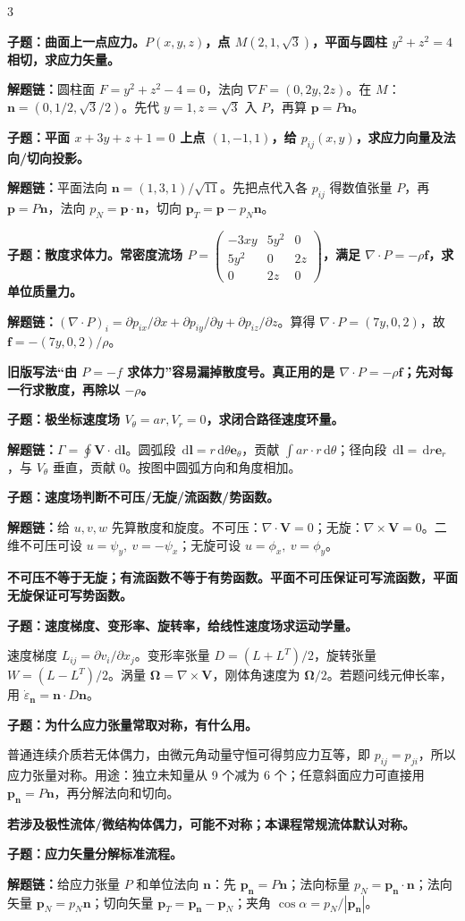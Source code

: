\documentclass[a4paper]{article}
\newcommand{\qt}[1]{\vspace{0.10pt}\colorbox{Q}{\parbox{\dimexpr\linewidth-2\fboxsep}{\color{white}\bfseries #1}}\par}
\newcommand{\ans}[1]{\colorbox{G}{\parbox{\dimexpr\linewidth-2\fboxsep}{#1}}\par}
\newcommand{\warn}[1]{\colorbox{Y}{\parbox{\dimexpr\linewidth-2\fboxsep}{\color{E}\bfseries #1}}\par}
\newcommand{\chain}[1]{{\color{A}\bfseries 解题链：}#1\par}
\newcommand{\dd}{\,\mathrm d}
\begin{document}
\begin{multicols}{3}
\qt{子题：曲面上一点应力。$P(x,y,z)$，点 $M(2,1,\sqrt3)$，平面与圆柱 $y^2+z^2=4$ 相切，求应力矢量。}
\chain{圆柱面 $F=y^2+z^2-4=0$，法向 $\nabla F=(0,2y,2z)$。在 $M$：$\bm n=(0,1/2,\sqrt3/2)$。先代 $y=1,z=\sqrt3$ 入 $P$，再算 $\bm p=P\bm n$。}

\qt{子题：平面 $x+3y+z+1=0$ 上点 $(1,-1,1)$，给 $p_{ij}(x,y)$，求应力向量及法向/切向投影。}
\chain{平面法向 $\bm n=(1,3,1)/\sqrt{11}$。先把点代入各 $p_{ij}$ 得数值张量 $P$，再 $\bm p=P\bm n$，法向 $p_N=\bm p\cdot\bm n$，切向 $\bm p_T=\bm p-p_N\bm n$。}

\qt{子题：散度求体力。常密度流场 $P=\begin{pmatrix}-3xy&5y^2&0\\5y^2&0&2z\\0&2z&0\end{pmatrix}$，满足 $\nabla\cdot P=-\rho\bm f$，求单位质量力。}
\chain{$(\nabla\cdot P)_i=\partial p_{ix}/\partial x+\partial p_{iy}/\partial y+\partial p_{iz}/\partial z$。算得 $\nabla\cdot P=(7y,0,2)$，故 $\bm f=-(7y,0,2)/\rho$。}
\warn{旧版写法“由 $P=-f$ 求体力”容易漏掉散度号。真正用的是 $\nabla\cdot P=-\rho\bm f$；先对每一行求散度，再除以 $-\rho$。}

\qt{子题：极坐标速度场 $V_\theta=ar,V_r=0$，求闭合路径速度环量。}
\chain{$\Gamma=\oint\bm V\cdot\dd\bm l$。圆弧段 $\dd\bm l=r\dd\theta\bm e_\theta$，贡献 $\int ar\cdot r\dd\theta$；径向段 $\dd\bm l=\dd r\bm e_r$，与 $V_\theta$ 垂直，贡献 0。按图中圆弧方向和角度相加。}

\qt{子题：速度场判断不可压/无旋/流函数/势函数。}
\chain{给 $u,v,w$ 先算散度和旋度。不可压：$\nabla\cdot\bm V=0$；无旋：$\nabla\times\bm V=0$。二维不可压可设 $u=\psi_y,\ v=-\psi_x$；无旋可设 $u=\phi_x,\ v=\phi_y$。}
\warn{不可压不等于无旋；有流函数不等于有势函数。平面不可压保证可写流函数，平面无旋保证可写势函数。}

\qt{子题：速度梯度、变形率、旋转率，给线性速度场求运动学量。}
\ans{速度梯度 $L_{ij}=\partial v_i/\partial x_j$。变形率张量 $D=(L+L^T)/2$，旋转张量 $W=(L-L^T)/2$。涡量 $\bm\Omega=\nabla\times\bm V$，刚体角速度为 $\bm\Omega/2$。若题问线元伸长率，用 $\dot\varepsilon_{\bm n}=\bm n\cdot D\bm n$。}

\qt{子题：为什么应力张量常取对称，有什么用。}
\ans{普通连续介质若无体偶力，由微元角动量守恒可得剪应力互等，即 $p_{ij}=p_{ji}$，所以应力张量对称。用途：独立未知量从 9 个减为 6 个；任意斜面应力可直接用 $\bm p_{\bm n}=P\bm n$，再分解法向和切向。}
\warn{若涉及极性流体/微结构体偶力，可能不对称；本课程常规流体默认对称。}

\qt{子题：应力矢量分解标准流程。}
\chain{给应力张量 $P$ 和单位法向 $\bm n$：先 $\bm p_{\bm n}=P\bm n$；法向标量 $p_N=\bm p_{\bm n}\cdot\bm n$；法向矢量 $\bm p_N=p_N\bm n$；切向矢量 $\bm p_T=\bm p_{\bm n}-\bm p_N$；夹角 $\cos\alpha=p_N/|\bm p_{\bm n}|$。}



\end{multicols}
\end{document}
